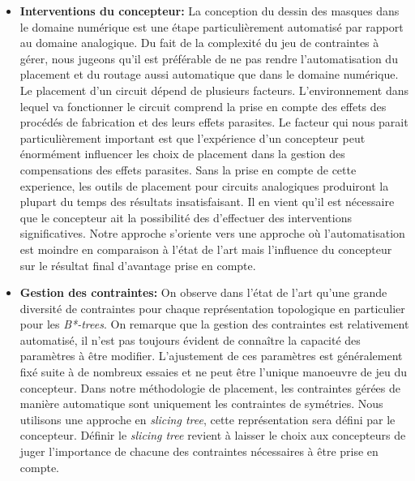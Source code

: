 \begin{itemize}
\item \textbf{Interventions du concepteur:} La conception du dessin des masques dans le domaine numérique est une étape particulièrement automatisé par rapport au domaine analogique. Du fait de la complexité du jeu de contraintes à gérer, nous jugeons qu'il est préférable de ne pas rendre l'automatisation du placement et du routage aussi automatique que dans le domaine numérique. Le placement d'un circuit dépend de plusieurs facteurs. L'environnement dans lequel va fonctionner le circuit comprend la prise en compte des effets des procédés de fabrication et des leurs effets parasites. Le facteur qui nous parait particulièrement important est que l'expérience d'un concepteur peut énormément influencer les choix de placement dans la gestion des compensations des effets parasites. Sans la prise en compte de cette experience, les outils de placement pour circuits analogiques produiront la plupart du temps des résultats insatisfaisant. Il en vient qu'il est nécessaire que le concepteur ait la possibilité des d'effectuer des interventions significatives. Notre approche s'oriente vers une approche o\`u l'automatisation est moindre en comparaison à l'état de l'art mais l'influence du concepteur sur le résultat final d'avantage prise en compte.

\item \textbf{Gestion des contraintes:} On observe dans l'état de l'art qu'une grande diversité de contraintes pour chaque représentation topologique en particulier pour les {\it B*-trees}. On remarque que la gestion des contraintes est relativement automatisé, il n'est pas toujours évident de connaître la capacité des paramètres à être modifier. L'ajustement de ces paramètres est généralement fixé suite à de nombreux essaies et ne peut être l'unique manoeuvre de jeu du concepteur. Dans notre méthodologie de placement, les contraintes gérées de manière automatique sont uniquement les contraintes de symétries. Nous utilisons une approche en {\it slicing tree}, cette représentation sera défini par le concepteur. Définir le {\it slicing tree} revient à laisser le choix aux concepteurs de juger l'importance de chacune des contraintes nécessaires à être prise en compte.


\end{itemize}
